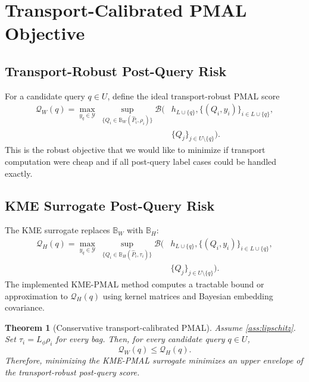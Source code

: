 \documentclass[10pt,journal]{IEEEtran}
\newtheorem{theorem}{Theorem}
\newcommand{\Ycal}{\mathcal{Y}}
\newcommand{\wh}{\widehat}
\newcommand{\ball}{\mathbb{B}}
\begin{document}
\section{Transport-Calibrated PMAL Objective}
\label{sec:objective}

\subsection{Transport-Robust Post-Query Risk}

For a candidate query $q\in U$, define the ideal transport-robust PMAL score
\begin{equation}
\label{eq:w-score}
\begin{aligned}
\mathcal{Q}_W(q)=
\max_{y_q\in\Ycal}\;
\sup_{\{Q_i\in\ball_W(\wh P_i,\rho_i)\}}
\mathcal{B}\big(&h_{L\cup\{q\}},
\{(Q_i,y_i)\}_{i\in L\cup\{q\}},\\
&\{Q_j\}_{j\in U\setminus\{q\}}\big).
\end{aligned}
\end{equation}
This is the robust objective that we would like to minimize if transport computation were cheap and if all post-query label cases could be handled exactly.

\subsection{KME Surrogate Post-Query Risk}

The KME surrogate replaces $\ball_W$ with $\ball_H$:
\begin{equation}
\label{eq:h-score}
\begin{aligned}
\mathcal{Q}_H(q)=
\max_{y_q\in\Ycal}\;
\sup_{\{Q_i\in\ball_H(\wh P_i,\tau_i)\}}
\mathcal{B}\big(&h_{L\cup\{q\}},
\{(Q_i,y_i)\}_{i\in L\cup\{q\}},\\
&\{Q_j\}_{j\in U\setminus\{q\}}\big).
\end{aligned}
\end{equation}
The implemented KME-PMAL method computes a tractable bound or approximation to $\mathcal{Q}_H(q)$ using kernel matrices and Bayesian embedding covariance.

\begin{theorem}[Conservative transport-calibrated PMAL]
\label{thm:conservative}
Assume \cref{ass:lipschitz}. Set $\tau_i=L_\phi\rho_i$ for every bag. Then, for every candidate query $q\in U$,
\begin{equation}
    \mathcal{Q}_W(q)\le \mathcal{Q}_H(q).
\end{equation}
Therefore, minimizing the KME-PMAL surrogate minimizes an upper envelope of the transport-robust post-query score.
\end{theorem}
\end{document}
